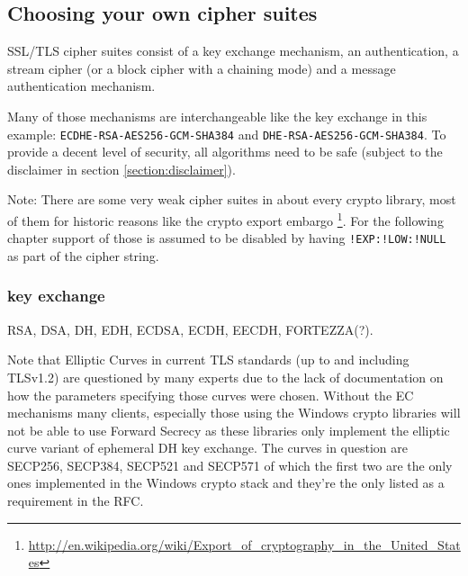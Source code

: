 \subsection{Choosing your own cipher suites}
\label{section:ChoosingYourOwnCipherSuites}


SSL/TLS cipher suites consist of a key exchange mechanism, an authentication, a
stream cipher (or a block cipher with a chaining mode) and a message authentication
mechanism.

Many of those mechanisms are interchangeable like the key exchange in this example:
\texttt{ECDHE-RSA-AES256-GCM-SHA384} and \texttt{DHE-RSA-AES256-GCM-SHA384}.
To provide a decent level of security, all algorithms need to be safe (subject to
the disclaimer in section \ref{section:disclaimer}).

Note: There are some very weak cipher suites in about every crypto library, most of
them for historic reasons like the crypto export embargo
\footnote{\url{http://en.wikipedia.org/wiki/Export_of_cryptography_in_the_United_States}}.
For the following chapter support of those is assumed to be disabled by having
\texttt{!EXP:!LOW:!NULL} as part of the cipher string.



\subsubsection{key exchange}

RSA, DSA, DH, EDH, ECDSA, ECDH, EECDH, FORTEZZA(?).

Note that Elliptic Curves in current TLS standards (up to and including TLSv1.2) are
questioned by many experts due to the lack of documentation on how the parameters
specifying those curves were chosen. Without the EC mechanisms many clients, especially
those using the Windows crypto libraries will not be able to use Forward Secrecy as these
libraries only implement the elliptic curve variant of ephemeral DH key exchange. The
curves in question are SECP256, SECP384, SECP521 and SECP571 of which the first two
are the only ones implemented in the Windows crypto stack and they're the only listed
as a requirement in the RFC. %

